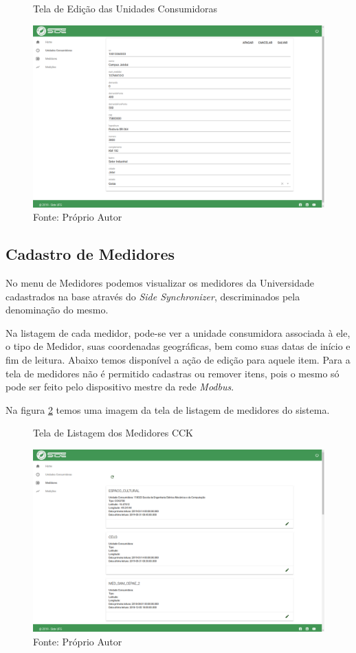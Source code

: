 \begin{figure}[H]
    \centering
    \caption{Tela de Edição das Unidades Consumidoras}
\includegraphics[width=\linewidth]{imagens/side/side-uc-edit.png}
    \caption*{Fonte: Próprio Autor}
    \label{fig:side-uc-edit}
\end{figure}

\subsection{Cadastro de Medidores}

No menu de Medidores podemos visualizar os medidores da Universidade cadastrados na base através do \textit{Side Synchronizer}, descriminados pela denominação do mesmo.

Na listagem de cada medidor, pode-se ver a unidade consumidora associada à ele, o tipo de Medidor, suas coordenadas geográficas, bem como suas datas de início e fim de leitura. Abaixo temos disponível a ação de edição para aquele item. Para a tela de medidores não é permitido cadastras ou remover itens, pois o mesmo só pode ser feito pelo dispositivo mestre da rede \textit{Modbus}.

Na figura \ref{fig:side-medidor-list} temos uma imagem da tela de listagem de medidores do sistema.

\begin{figure}[H]
    \centering
    \caption{Tela de Listagem dos Medidores CCK}
\includegraphics[width=0.75\linewidth]{imagens/side/side-medidor-list.png}
    \caption*{Fonte: Próprio Autor}
    \label{fig:side-medidor-list}
\end{figure}

